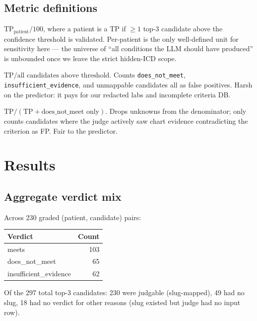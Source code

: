 \documentclass[11pt]{article}
\begin{document}
\subsection{Metric definitions}
\begin{description}[leftmargin=*]
\item[Sensitivity (per-patient)] $\text{TP}_{\text{patient}} / 100$, where a patient is a TP
    if $\geq 1$ top-3 candidate above the confidence threshold is validated. Per-patient is
    the only well-defined unit for sensitivity here --- the universe of ``all conditions
    the LLM should have produced'' is unbounded once we leave the strict hidden-ICD scope.
\item[PPV strict (per-candidate)] $\text{TP} / \text{all candidates above threshold}$.
    Counts \texttt{does\_not\_meet}, \texttt{insufficient\_evidence}, and unmappable
    candidates all as false positives. Harsh on the predictor: it pays for our redacted
    labs and incomplete criteria DB.
\item[PPV lenient (per-candidate)] $\text{TP} / (\text{TP} + \text{does\_not\_meet only})$.
    Drops unknowns from the denominator; only counts candidates where the judge actively
    saw chart evidence contradicting the criterion as FP. Fair to the predictor.
\end{description}

\section{Results}

\subsection{Aggregate verdict mix}
Across 230 graded (patient, candidate) pairs:
\begin{center}
\begin{tabular}{lr}
\toprule
Verdict & Count \\
\midrule
meets & 103 \\
does\_not\_meet & 65 \\
insufficient\_evidence & 62 \\
\bottomrule
\end{tabular}
\end{center}

Of the 297 total top-3 candidates: 230 were judgable (slug-mapped), 49 had no slug,
18 had no verdict for other reasons (slug existed but judge had no input row).
\end{document}
